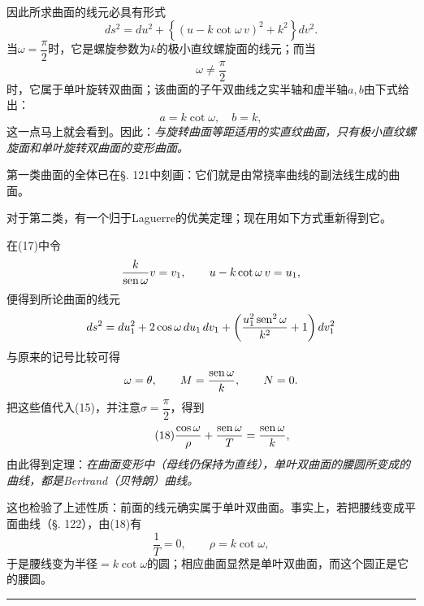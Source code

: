 因此所求曲面的线元必具有形式
\begin{equation}\tag{17}
 ds^2=du^2+\left\{(u-k\cot\omega\,v)^2+k^2\right\}dv^2 .
\end{equation}
当\(\omega=\dfrac\pi2\)时，它是螺旋参数为\(k\)的极小直纹螺旋面的线元；而当
\[
 \omega\ne\frac\pi2
\]
时，它属于单叶旋转双曲面；该曲面的子午双曲线之实半轴和虚半轴\(a,b\)由下式给出：
\[
 a=k\cot\omega,\quad b=k,
\]
这一点马上就会看到。因此：\emph{与旋转曲面等距适用的实直纹曲面，只有极小直纹螺旋面和单叶旋转双曲面的变形曲面。}

第一类曲面的全体已在\S. 121中刻画：它们就是由常挠率曲线的副法线生成的曲面。

对于第二类，有一个归于Laguerre的优美定理；现在用如下方式重新得到它。

在(17)中令
\[
 \frac{k}{\operatorname{sen}\omega}v=v_1,
 \qquad u-k\cot\omega\,v=u_1,
\]
便得到所论曲面的线元
\[
 ds^2=du_1^2+2\cos\omega\,du_1\,dv_1+\left(\frac{u_1^2\operatorname{sen}^2\omega}{k^2}+1\right)dv_1^2
\]
与原来的记号比较可得
\[
 \omega=\theta,
 \qquad M=\frac{\operatorname{sen}\omega}{k},
 \qquad N=0.
\]
把这些值代入(15)，并注意\(\sigma=\dfrac\pi2\)，得到
\begin{equation}\tag{18}
 \frac{\cos\omega}{\rho}+\frac{\operatorname{sen}\omega}{T}=\frac{\operatorname{sen}\omega}{k},
\end{equation}
由此得到定理：\emph{在曲面变形中（母线仍保持为直线），单叶双曲面的腰圆所变成的曲线，都是Bertrand（贝特朗）曲线。}

这也检验了上述性质：前面的线元确实属于单叶双曲面。事实上，若把腰线变成平面曲线（\S. 122），由(18)有
\[
 \frac1T=0,
 \qquad \rho=k\cot\omega,
\]
于是腰线变为半径\(=k\cot\omega\)的圆；相应曲面显然是单叶双曲面，而这个圆正是它的腰圆。

\begin{center}\rule{4em}{0.4pt}\end{center}
